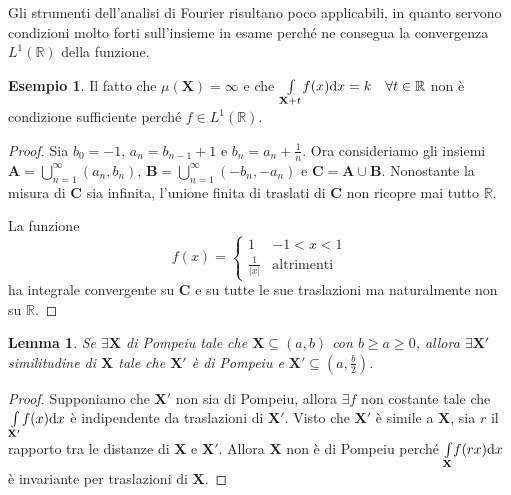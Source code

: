 \documentclass[12pt]{article}
\newcommand\rea{\mathbb R}
\newcommand\ins[1]{\mathbf #1}
\newcommand\pom{di Pompeiu}
\newcommand\intes[2]{\int\limits_{#1}\!#2\text dx}
\newcommand\intesx[2]{\int\limits_{#1}\!#2(x)\text dx}
\newtheorem{lemma}{Lemma}
\theoremstyle{definition}
\newtheorem{esem}{Esempio}
\begin{document}
Gli strumenti dell'analisi di Fourier risultano poco applicabili,
in quanto servono condizioni molto forti sull'insieme in esame
perché ne consegua la convergenza $L^1(\rea)$ della funzione.
\begin{esem}Il fatto che $\mu(\ins X)=\infty$ e che
$\intesx{\ins X+t}f=k\quad\forall t\in\rea$
non è condizione sufficiente perché $f\in L^1(\rea)$.
\end{esem}
\begin{proof}Sia $b_0=-1$, $a_n=b_{n-1}+1$ e $b_n=a_n+\frac1n$.
Ora consideriamo gli insiemi $\ins A=\bigcup_{n=1}^\infty(a_n,b_n)$,
$\ins B=\bigcup_{n=1}^\infty(-b_n,-a_n)$ e $\ins C=\ins A\cup\ins B$.
Nonostante la misura di $\ins C$ sia infinita,
l'unione finita di traslati di $\ins C$ non ricopre mai tutto $\rea$.

La funzione
\begin{equation*}
f(x)=\left\{\begin{matrix}1&-1<x<1\\\frac1{|x|}&\text {altrimenti}
\end{matrix}\right.
\end{equation*}
ha integrale convergente su $\ins C$ e su tutte le sue traslazioni
ma naturalmente non su $\rea$.
\end{proof}

\begin{lemma}
Se $\exists \ins X$ \pom{} tale che $\ins X \subseteq (a,b)$ con $b\geq a\geq0$,
allora $\exists \ins{X'}$ similitudine di $\ins X$ tale che $\ins{X'}$ è \pom{} e
$\ins{X'}\subseteq\left(a,\frac b2\right)$.
\end{lemma}
\begin{proof}
Supponiamo che $\ins{X'}$ non sia \pom{}, allora $\exists f$ non costante
tale che $\intesx{\ins X'}f$ è indipendente da traslazioni di $\ins{X'}$.
Visto che $\ins{X'}$ è simile a $\ins X$, sia $r$ il rapporto tra le distanze
di $\ins X$ e $\ins{X'}$. Allora $\ins X$ non è \pom{} perché
$\intes{\ins X}{f(rx)}$ è invariante per traslazioni di $\ins X$.
\end{proof}
\end{document}

